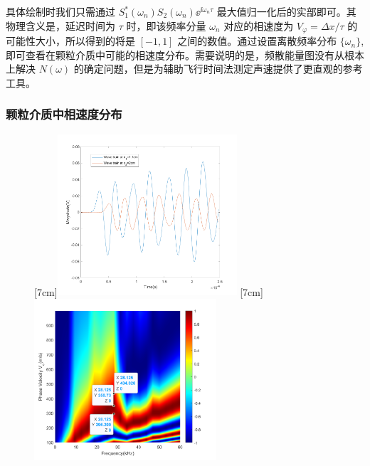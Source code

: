 具体绘制时我们只需通过 $S_{1}^{*}(\omega_{n})S_{2}(\omega_{n}){\ee}^{\ii\omega_{n}\tau}$ 最大值归一化后的实部即可。其物理含义是，延迟时间为 $\tau$ 时，即该频率分量 $\omega_{n}$ 对应的相速度为 $V_{\varphi} = \Delta x/\tau$ 的可能性大小，所以得到的将是 $[-1,1]$ 之间的数值。通过设置离散频率分布 $\{\omega_{n}\}$, 即可查看在颗粒介质中可能的相速度分布。需要说明的是，频散能量图没有从根本上解决 $N(\omega)$ 的确定问题，但是为辅助飞行时间法测定声速提供了更直观的参考工具。

\subsubsection{颗粒介质中相速度分布}


\begin{figure}[!hbtp]
  \centering
                [7cm]{\includegraphics[height=6cm]{figures/2_wave_train.png}}
  \hspace{1cm}
                [7cm]{\includegraphics[height=6cm]{figures/2_cwt_v_phi.png}}
  \label{fig:dispersion_energy}
\end{figure}

